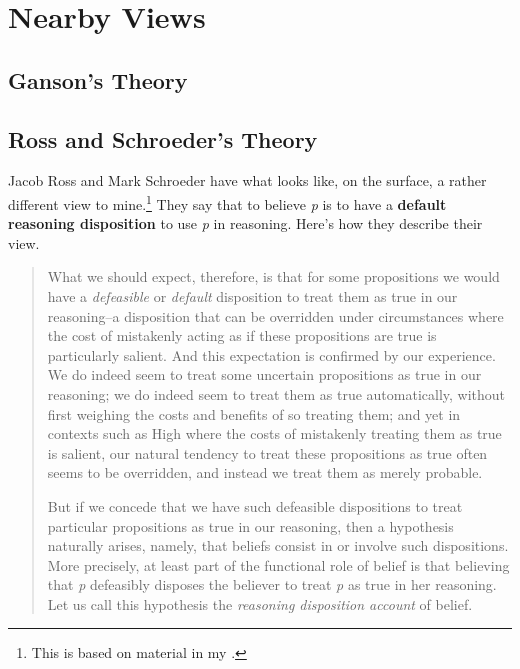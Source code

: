 \documentclass[11pt,]{book}
\let\rmarkdownfootnote\footnote%
\def\footnote{\protect\rmarkdownfootnote}
\begin{document}
\hypertarget{nearby-views}{%
\section{Nearby Views}\label{nearby-views}}

\hypertarget{ganson}{%
\subsection{Ganson's Theory}\label{ganson}}

\hypertarget{usc}{%
\subsection{Ross and Schroeder's Theory}\label{usc}}

Jacob Ross and Mark Schroeder \citeyearpar{RossSchroeder2014} have what looks like, on the surface, a rather different view to mine.\footnote{This is based on material in my \citeyearpar[sect. 3]{Weatherson2016}.} They say that to believe \emph{p} is to have a \textbf{default reasoning disposition} to use \emph{p} in reasoning. Here's how they describe their view.

\begin{quote}
What we should expect, therefore, is that for some propositions we would have a \emph{defeasible} or \emph{default} disposition to treat them as true in our reasoning--a disposition that can be overridden under circumstances where the cost of mistakenly acting as if these propositions are true is particularly salient. And this expectation is confirmed by our experience. We do indeed seem to treat some uncertain propositions as true in our reasoning; we do indeed seem to treat them as true automatically, without first weighing the costs and benefits of so treating them; and yet in contexts such as High where the costs of mistakenly treating them as true is salient, our natural tendency to treat these propositions as true often seems to be overridden, and instead we treat them as merely probable.

But if we concede that we have such defeasible dispositions to treat particular propositions as true in our reasoning, then a hypothesis naturally arises, namely, that beliefs consist in or involve such dispositions. More precisely, at least part of the functional role of belief is that believing that \emph{p} defeasibly disposes the believer to treat \emph{p} as true in her reasoning. Let us call this hypothesis the \emph{reasoning disposition account} of belief. \citep[ 9-10]{RossSchroeder2014}
\end{quote}
\end{document}
